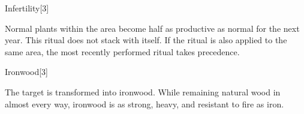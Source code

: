 \begin{spellsection}{Infertility}[3]
\begin{spellcontent}
\begin{spelltargetinginfo}
\end{spelltargetinginfo}
\begin{spelleffects}
\spelleffect
Normal plants within the area become half as productive as normal for the next year.
This ritual does not stack with itself.
If the  ritual is also applied to the same area, the most recently performed ritual takes precedence.
\end{spelleffects}
\end{spellcontent}
\begin{spellfooter}
\end{spellfooter}
\begin{spellsubcontent}
\end{spellsubcontent}
\end{spellsection}
\begin{spellsection}{Ironwood}[3]
\begin{spellcontent}
\begin{spelltargetinginfo}
\end{spelltargetinginfo}
\begin{spelleffects}
\spelleffect
The target is transformed into ironwood.
While remaining natural wood in almost every way, ironwood is as strong, heavy, and resistant to fire as iron.
\end{spelleffects}
\end{spellcontent}
\begin{spellfooter}
\end{spellfooter}
\begin{spellsubcontent}
\end{spellsubcontent}
\end{spellsection}
